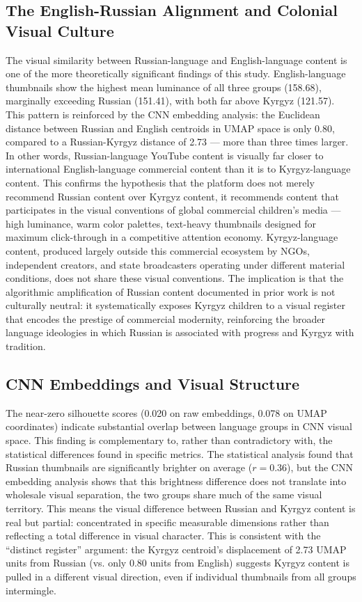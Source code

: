 \documentclass[12pt, letterpaper]{article}
\begin{document}
\subsection{The English-Russian Alignment and Colonial Visual Culture}

The visual similarity between Russian-language and English-language content is one of the more theoretically significant findings of this study. English-language thumbnails show the highest mean luminance of all three groups (158.68), marginally exceeding Russian (151.41), with both far above Kyrgyz (121.57). This pattern is reinforced by the CNN embedding analysis: the Euclidean distance between Russian and English centroids in UMAP space is only 0.80, compared to a Russian-Kyrgyz distance of 2.73 — more than three times larger. In other words, Russian-language YouTube content is visually far closer to international English-language commercial content than it is to Kyrgyz-language content. This confirms the hypothesis that the platform does not merely recommend Russian content over Kyrgyz content, it recommends content that participates in the visual conventions of global commercial children's media — high luminance, warm color palettes, text-heavy thumbnails designed for maximum click-through in a competitive attention economy. Kyrgyz-language content, produced largely outside this commercial ecosystem by NGOs, independent creators, and state broadcasters operating under different material conditions, does not share these visual conventions. The implication is that the algorithmic amplification of Russian content documented in prior work is not culturally neutral: it systematically exposes Kyrgyz children to a visual register that encodes the prestige of commercial modernity, reinforcing the broader language ideologies in which Russian is associated with progress and Kyrgyz with tradition.

\subsection{CNN Embeddings and Visual Structure}

The near-zero silhouette scores (0.020 on raw embeddings, 0.078 on UMAP coordinates) indicate substantial overlap between language groups in CNN visual space. This finding is complementary to, rather than contradictory with, the statistical differences found in specific metrics. The statistical analysis found that Russian thumbnails are significantly brighter on average ($r = 0.36$), but the CNN embedding analysis shows that this brightness difference does not translate into wholesale visual separation, the two groups share much of the same visual territory. This means the visual difference between Russian and Kyrgyz content is real but partial: concentrated in specific measurable dimensions rather than reflecting a total difference in visual character. This is consistent with the ``distinct register'' argument: the Kyrgyz centroid's displacement of 2.73 UMAP units from Russian (vs. only 0.80 units from English) suggests Kyrgyz content is pulled in a different visual direction, even if individual thumbnails from all groups intermingle.
\end{document}

